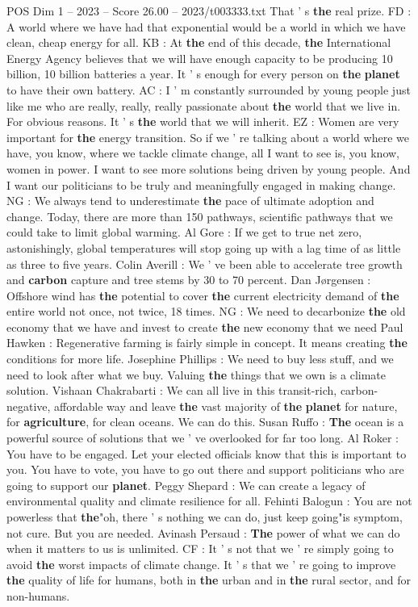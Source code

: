 \begin{textsample}{POS Dim 1 – 2023 – Score 26.00 – 2023/t003333.txt}
That ' s \textbf{the} real prize.
FD : A world where we have had that exponential would be a world in which we have clean, cheap energy for all.
KB : At \textbf{the} end of this decade, \textbf{the} International Energy Agency believes that we will have enough capacity to be producing 10 billion, 10 billion batteries a year.
It ' s enough for every person on \textbf{the} \textbf{planet} to have their own battery.
AC : I ' m constantly surrounded by young people just like me who are really, really, really passionate about \textbf{the} world that we live in.
For obvious reasons.
It ' s \textbf{the} world that we will inherit.
EZ : Women are very important for \textbf{the} energy transition.
So if we ' re talking about a world where we have, you know, where we tackle climate change, all I want to see is, you know, women in power.
I want to see more solutions being driven by young people.
And I want our politicians to be truly and meaningfully engaged in making change.
NG : We always tend to underestimate \textbf{the} pace of ultimate adoption and change.
Today, there are more than 150 pathways, scientific pathways that we could take to limit global warming.
Al Gore : If we get to true net zero, astonishingly, global temperatures will stop going up with a lag time of as little as three to five years.
Colin Averill : We ' ve been able to accelerate tree growth and \textbf{carbon} capture and tree stems by 30 to 70 percent.
Dan Jørgensen : Offshore wind has \textbf{the} potential to cover \textbf{the} current electricity demand of \textbf{the} entire world not once, not twice, 18 times.
NG : We need to decarbonize \textbf{the} old economy that we have and invest to create \textbf{the} new economy that we need Paul Hawken : Regenerative farming is fairly simple in concept.
It means creating \textbf{the} conditions for more life.
Josephine Phillips : We need to buy less stuff, and we need to look after what we buy.
Valuing \textbf{the} things that we own is a climate solution.
Vishaan Chakrabarti : We can all live in this transit-rich, carbon-negative, affordable way and leave \textbf{the} vast majority of \textbf{the} \textbf{planet} for nature, for \textbf{agriculture}, for clean oceans.
We can do this.
Susan Ruffo : \textbf{The} ocean is a powerful source of solutions that we ' ve overlooked for far too long.
Al Roker : You have to be engaged.
Let your elected officials know that this is important to you.
You have to vote, you have to go out there and support politicians who are going to support our \textbf{planet}.
Peggy Shepard : We can create a legacy of environmental quality and climate resilience for all.
Fehinti Balogun : You are not powerless that \textbf{the}"oh, there ' s nothing we can do, just keep going"is symptom, not cure.
But you are needed.
Avinash Persaud : \textbf{The} power of what we can do when it matters to us is unlimited.
CF : It ' s not that we ' re simply going to avoid \textbf{the} worst impacts of climate change.
It ' s that we ' re going to improve \textbf{the} quality of life for humans, both in \textbf{the} urban and in \textbf{the} rural sector, and for non-humans.


\end{textsample}
